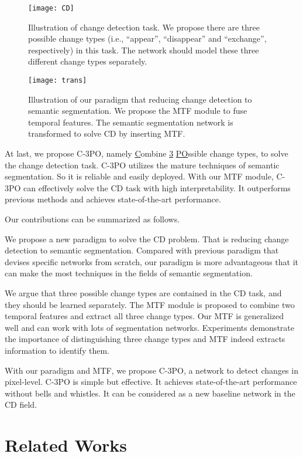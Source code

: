 \documentclass[review]{elsarticle}
\begin{document}
\begin{figure}
	\centering
	\texttt{[image: CD]}
	\caption{Illustration of change detection task. We propose there are three possible change types (i.e., ``appear'', ``disappear'' and ``exchange'', respectively) in this task. The network should model these three different change types separately.}
	\label{fig:CD}
\end{figure}

\begin{figure}
	\centering
	\texttt{[image: trans]}
	\caption{Illustration of our paradigm that reducing change detection to semantic segmentation. We propose the MTF module to fuse temporal features. The semantic segmentation network is transformed to solve CD by inserting MTF.}
	\label{fig:Trans}
\end{figure}

At last, we propose C-3PO, namely \underline{C}ombine \underline{3} \underline{PO}ssible change types, to solve the change detection task. C-3PO utilizes the mature techniques of semantic segmentation. So it is reliable and easily deployed. With our MTF module, C-3PO can effectively solve the CD task with high interpretability. It outperforms previous methods and achieves state-of-the-art performance.

Our contributions can be summarized as follows.

 We propose a new paradigm to solve the CD problem. That is reducing change detection to semantic segmentation. Compared with previous paradigm that devises specific networks from scratch, our paradigm is more advantageous that it can make the most techniques in the fields of semantic segmentation.

 We argue that three possible change types are contained in the CD task, and they should be learned separately. The MTF module is proposed to combine two temporal features and extract all three change types. Our MTF is generalized well and can work with lots of segmentation networks. Experiments demonstrate the importance of distinguishing three change types and MTF indeed extracts information to identify them. 

 With our paradigm and MTF, we propose C-3PO, a network to detect changes in pixel-level. C-3PO is simple but effective. It achieves state-of-the-art performance without bells and whistles. It can be considered as a new baseline network in the CD field.

\section{Related Works}
\end{document}
